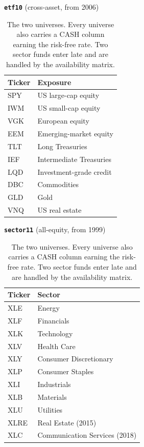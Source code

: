 \begin{table}[t]
  \centering
  \begin{minipage}[t]{0.48\textwidth}
    \centering
    \textbf{\texttt{etf10}} (cross-asset, from 2006)\\[2pt]
    \begin{tabular}{ll}
      \hline
      Ticker & Exposure \\
      \hline
      SPY & US large-cap equity \\
      IWM & US small-cap equity \\
      VGK & European equity \\
      EEM & Emerging-market equity \\
      TLT & Long Treasuries \\
      IEF & Intermediate Treasuries \\
      LQD & Investment-grade credit \\
      DBC & Commodities \\
      GLD & Gold \\
      VNQ & US real estate \\
      \hline
    \end{tabular}
  \end{minipage}
  \hfill
  \begin{minipage}[t]{0.48\textwidth}
    \centering
    \textbf{\texttt{sector11}} (all-equity, from 1999)\\[2pt]
    \begin{tabular}{ll}
      \hline
      Ticker & Sector \\
      \hline
      XLE & Energy \\
      XLF & Financials \\
      XLK & Technology \\
      XLV & Health Care \\
      XLY & Consumer Discretionary \\
      XLP & Consumer Staples \\
      XLI & Industrials \\
      XLB & Materials \\
      XLU & Utilities \\
      XLRE & Real Estate (2015) \\
      XLC & Communication Services (2018) \\
      \hline
    \end{tabular}
  \end{minipage}
  \caption{The two universes. Every universe also carries a CASH column earning
  the risk-free rate. Two sector funds enter late and are handled by the
  availability matrix.}
  \label{tab:universes}
\end{table}

